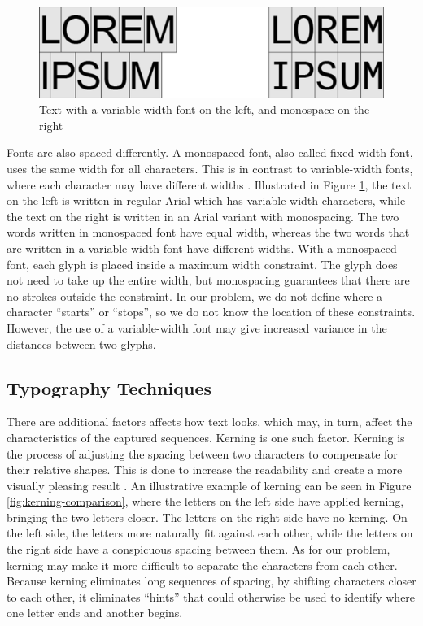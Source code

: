 \begin{figure}[ht]
    \centering
    \includegraphics[width=1.0\textwidth]{fig/chapter2/regular_mono_comparison.png}
    \caption{Text with a variable-width font on the left, and monospace on the right}
    \label{fig:regular-mono-comparison}
\end{figure}

Fonts are also spaced differently. A monospaced font, also called fixed-width font, uses the same width for all characters. This is in contrast to variable-width fonts, where each character may have different widths \citep{felici2011complete}. Illustrated in Figure \ref{fig:regular-mono-comparison}, the text on the left is written in regular Arial which has variable width characters, while the text on the right is written in an Arial variant with monospacing. The two words written in monospaced font have equal width, whereas the two words that are written in a variable-width font have different widths. With a monospaced font, each glyph is placed inside a maximum width constraint. The glyph does not need to take up the entire width, but monospacing guarantees that there are no strokes outside the constraint. In our problem, we do not define where a character ``starts'' or ``stops'', so we do not know the location of these constraints. However, the use of a variable-width font may give increased variance in the distances between two glyphs.

\subsection{Typography Techniques}
\label{sec:other_factors}
There are additional factors affects how text looks, which may, in turn, affect the characteristics of the captured sequences. Kerning is one such factor. Kerning is the process of adjusting the spacing between two characters to compensate for their relative shapes. This is done to increase the readability and create a more visually pleasing result \citep{felici2011complete}. An illustrative example of kerning can be seen in Figure \ref{fig:kerning-comparison}, where the letters on the left side have applied kerning, bringing the two letters closer. The letters on the right side have no kerning. On the left side, the letters more naturally fit against each other, while the letters on the right side have a conspicuous spacing between them. As for our problem, kerning may make it more difficult to separate the characters from each other. Because kerning eliminates long sequences of spacing, by shifting characters closer to each other, it eliminates ``hints'' that could otherwise be used to identify where one letter ends and another begins.

